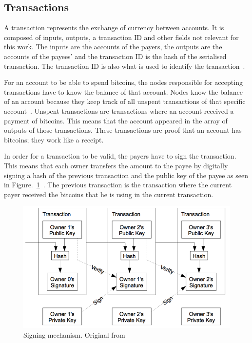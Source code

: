 \subsection{Transactions}
\label{sec:transactions}

A  transaction represents the exchange of currency between accounts. It is composed of inputs, outputs, a transaction ID and other fields not relevant for this work. The inputs are the accounts of the payers, the outputs are the accounts of the payees' and the transaction ID is the hash of the serialised transaction. The transaction ID is also what is used to identify the transaction~\cite{decker2013information}.

For an account to be able to spend bitcoins, the nodes responsible for accepting transactions have to know the balance of that account. Nodes know the balance of an account because they keep track of all unspent transactions of that specific account~\cite{decker2013information}. Unspent transactions are transactions where an account received a payment of bitcoins. This means that the account appeared in the array of outputs of those transactions. These transactions are proof that an account has bitcoins; they work like a receipt. 

In order for a transaction to be valid, the payers have to sign the transaction. This means that each owner transfers the amount to the payee by digitally signing a hash of the previous transaction and the public key of the payee as seen in Figure.~\ref{fig:signature}~\cite{nakamoto2008bitcoin}. The previous transaction is the transaction where the current payer received the bitcoins that he is using in the current transaction.

\begin{figure}[h]
\centering
\includegraphics[scale=0.5]{figs/transactions}
\caption{Signing mechanism. Original from~\protect\cite{nakamoto2008bitcoin}}
\label{fig:signature}
\end{figure}

